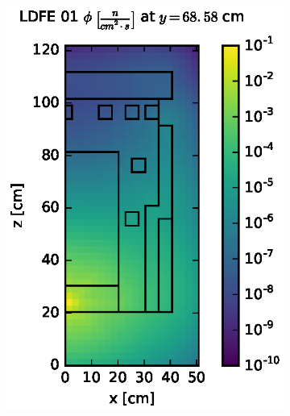 \begin{figure}[!htb]
\begin{subfigure}{0.4\textwidth}
\includegraphics[max height=0.445\textheight]
{img/dlvn-plots/fwd/flux-ldfe01-slice.eps}
\end{subfigure} ~
\begin{subfigure}{0.4\textwidth}

\end{subfigure}
\end{figure}
